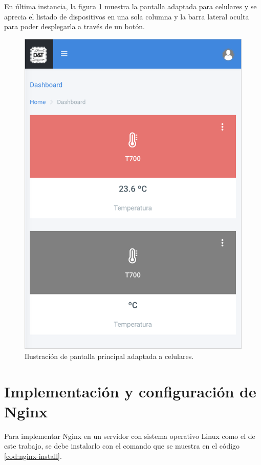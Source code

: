 \pagebreak
En última instancia, la figura \ref{fig:pantalla-celu} muestra la pantalla adaptada para celulares y se aprecia el listado de dispositivos en una sola columna y la barra lateral oculta para poder desplegarla a través de un botón.

\begin{figure}[htpb]
	\centering
	\includegraphics[scale=.60]{./Figures/pantalla-celu.png}
	\caption[Pantalla adaptada a celulares]{Ilustración de pantalla principal adaptada a celulares.}
	\label{fig:pantalla-celu}
\end{figure}

\newpage
\section{Implementación y configuración de Nginx}

Para implementar Nginx en un servidor con sistema operativo Linux como el de este trabajo,  se debe instalarlo con el comando que se muestra en el código \ref{cod:nginx-install}. 

